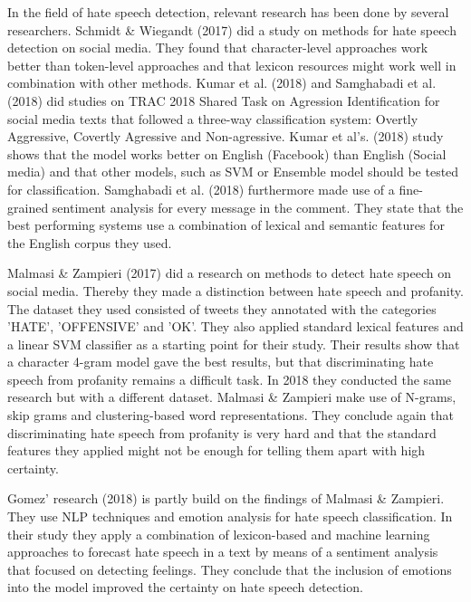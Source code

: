\documentclass[a4paper,pdf]{article} %
\begin{document}
In the field of hate speech detection, relevant research has been done by several researchers. Schmidt \& Wiegandt (2017) did a study on methods for hate speech detection on social media. They found that character-level approaches work better than token-level approaches and that lexicon resources might work well in combination with other methods. Kumar et al. (2018) and Samghabadi et al. (2018) did studies on TRAC 2018 Shared Task on Agression Identification for social media texts that followed a three-way classification system: Overtly Aggressive, Covertly Agressive and Non-agressive. Kumar et al's. (2018) study shows that the model works better on English (Facebook) than English (Social media) and that other models, such as SVM or Ensemble model should be tested for classification. Samghabadi et al. (2018) furthermore made use of a fine-grained sentiment analysis for every message in the comment. They state that the best performing systems use a combination of lexical and semantic features for the English corpus they used.

Malmasi \& Zampieri (2017) did a research on methods to detect hate speech on social media. Thereby they made a distinction between hate speech and profanity. The dataset they used consisted of tweets they annotated with the categories 'HATE', 'OFFENSIVE' and 'OK'. They also applied standard lexical features and a linear SVM classifier as a starting point for their study. Their results show that a character 4-gram model gave the best results, but that discriminating hate speech from profanity remains a difficult task. In 2018 they conducted the same research but with a different dataset. Malmasi \& Zampieri make use of N-grams, skip grams and clustering-based word representations. They conclude again that discriminating hate speech from profanity is very hard and that the standard features they applied might not be enough for telling them apart with high certainty.

Gomez' research (2018) is partly build on the findings of Malmasi \& Zampieri. They use NLP techniques and emotion analysis for hate speech classification. In their study they apply a combination of lexicon-based and machine learning approaches to forecast hate speech in a text by means of a sentiment analysis that focused on detecting feelings. They conclude that the inclusion of emotions into the model improved the certainty on hate speech detection.\\

\end{document}
